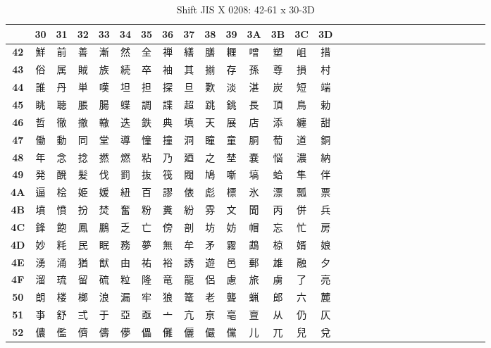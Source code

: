 \begin{table}[H]
\Fontified
\centering
\caption{Shift JIS X 0208: 42-61 x 30-3D}
\begin{tabular}{|Sc|Sc|Sc|Sc|Sc|Sc|Sc|Sc|Sc|Sc|Sc|Sc|Sc|Sc|Sc|}
\hline
 & \textbf{30} & \textbf{31} & \textbf{32} & \textbf{33} & \textbf{34} & \textbf{35} & \textbf{36} & \textbf{37} & \textbf{38} & \textbf{39} & \textbf{3A} & \textbf{3B} & \textbf{3C} & \textbf{3D} \\ \hline
\textbf{42} & 鮮 & 前 & 善 & 漸 & 然 & 全 & 禅 & 繕 & 膳 & 糎 & 噌 & 塑 & 岨 & 措 \\ \hline
\textbf{43} & 俗 & 属 & 賊 & 族 & 続 & 卒 & 袖 & 其 & 揃 & 存 & 孫 & 尊 & 損 & 村 \\ \hline
\textbf{44} & 誰 & 丹 & 単 & 嘆 & 坦 & 担 & 探 & 旦 & 歎 & 淡 & 湛 & 炭 & 短 & 端 \\ \hline
\textbf{45} & 眺 & 聴 & 脹 & 腸 & 蝶 & 調 & 諜 & 超 & 跳 & 銚 & 長 & 頂 & 鳥 & 勅 \\ \hline
\textbf{46} & 哲 & 徹 & 撤 & 轍 & 迭 & 鉄 & 典 & 填 & 天 & 展 & 店 & 添 & 纏 & 甜 \\ \hline
\textbf{47} & 働 & 動 & 同 & 堂 & 導 & 憧 & 撞 & 洞 & 瞳 & 童 & 胴 & 萄 & 道 & 銅 \\ \hline
\textbf{48} & 年 & 念 & 捻 & 撚 & 燃 & 粘 & 乃 & 廼 & 之 & 埜 & 嚢 & 悩 & 濃 & 納 \\ \hline
\textbf{49} & 発 & 醗 & 髪 & 伐 & 罰 & 抜 & 筏 & 閥 & 鳩 & 噺 & 塙 & 蛤 & 隼 & 伴 \\ \hline
\textbf{4A} & 逼 & 桧 & 姫 & 媛 & 紐 & 百 & 謬 & 俵 & 彪 & 標 & 氷 & 漂 & 瓢 & 票 \\ \hline
\textbf{4B} & 墳 & 憤 & 扮 & 焚 & 奮 & 粉 & 糞 & 紛 & 雰 & 文 & 聞 & 丙 & 併 & 兵 \\ \hline
\textbf{4C} & 鋒 & 飽 & 鳳 & 鵬 & 乏 & 亡 & 傍 & 剖 & 坊 & 妨 & 帽 & 忘 & 忙 & 房 \\ \hline
\textbf{4D} & 妙 & 粍 & 民 & 眠 & 務 & 夢 & 無 & 牟 & 矛 & 霧 & 鵡 & 椋 & 婿 & 娘 \\ \hline
\textbf{4E} & 湧 & 涌 & 猶 & 猷 & 由 & 祐 & 裕 & 誘 & 遊 & 邑 & 郵 & 雄 & 融 & 夕 \\ \hline
\textbf{4F} & 溜 & 琉 & 留 & 硫 & 粒 & 隆 & 竜 & 龍 & 侶 & 慮 & 旅 & 虜 & 了 & 亮 \\ \hline
\textbf{50} & 朗 & 楼 & 榔 & 浪 & 漏 & 牢 & 狼 & 篭 & 老 & 聾 & 蝋 & 郎 & 六 & 麓 \\ \hline
\textbf{51} & 亊 & 舒 & 弍 & 于 & 亞 & 亟 & 亠 & 亢 & 亰 & 亳 & 亶 & 从 & 仍 & 仄 \\ \hline
\textbf{52} & 儂 & 儖 & 儕 & 儔 & 儚 & 儡 & 儺 & 儷 & 儼 & 儻 & 儿 & 兀 & 兒 & 兌 \\ \hline

\end{tabular}
\end{table}
